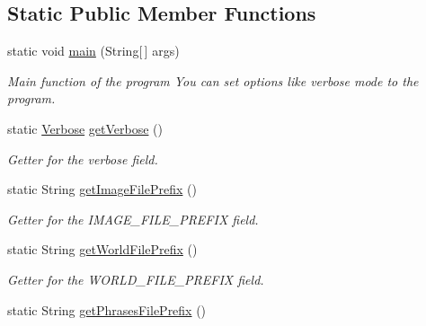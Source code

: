 \subsection*{Static Public Member Functions}
\begin{DoxyCompactItemize}
\item 
static void \hyperlink{classmain_1_1_philophobia_adeef1622cd186b7c8305bb00f9388d43}{main} (String\mbox{[}$\,$\mbox{]} args)
\begin{DoxyCompactList}\small\item\em Main function of the program You can set options like verbose mode to the program. \end{DoxyCompactList}\item 
static \hyperlink{classdebug_1_1_verbose}{Verbose} \hyperlink{classmain_1_1_philophobia_aa9bbd49d874f4dfdf5358bbdad6d8c99}{get\-Verbose} ()
\begin{DoxyCompactList}\small\item\em Getter for the verbose field. \end{DoxyCompactList}\item 
static String \hyperlink{classmain_1_1_philophobia_af77ca65c091ecf625186103af2eac126}{get\-Image\-File\-Prefix} ()
\begin{DoxyCompactList}\small\item\em Getter for the I\-M\-A\-G\-E\-\_\-\-F\-I\-L\-E\-\_\-\-P\-R\-E\-F\-I\-X field. \end{DoxyCompactList}\item 
static String \hyperlink{classmain_1_1_philophobia_ac710346031adfebc390d69138c918b8e}{get\-World\-File\-Prefix} ()
\begin{DoxyCompactList}\small\item\em Getter for the W\-O\-R\-L\-D\-\_\-\-F\-I\-L\-E\-\_\-\-P\-R\-E\-F\-I\-X field. \end{DoxyCompactList}\item 
static String \hyperlink{classmain_1_1_philophobia_a82dab0d4c111eea30c98cdb288a469c8}{get\-Phrases\-File\-Prefix} ()
\end{DoxyCompactItemize}
